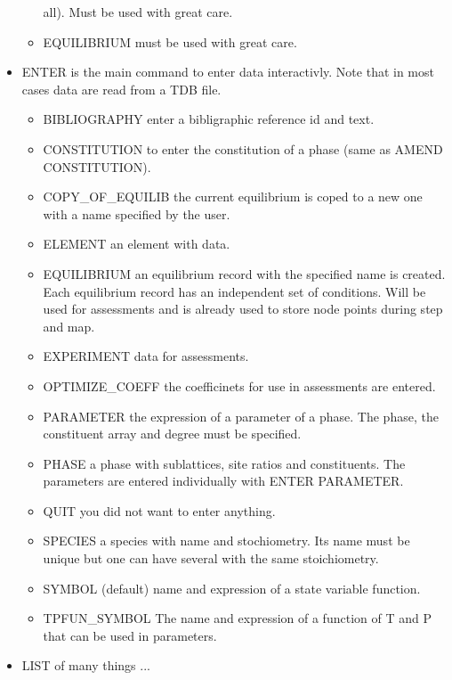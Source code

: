 \documentclass[12pt]{article}
\begin{document}
\begin{itemize}
\begin{itemize}
    all).  Must be used with great care.
  \item EQUILIBRIUM must be used with great care.
  \end{itemize}
\item ENTER is the main command to enter data interactivly.  Note that
  in most cases data are read from a TDB file.
  \begin{itemize}
  \item BIBLIOGRAPHY enter a bibligraphic reference id and text.
  \item CONSTITUTION to enter the constitution of a phase (same as AMEND
    CONSTITUTION).
  \item COPY\_OF\_EQUILIB the current equilibrium is coped to a new one
    with a name specified by the user.
  \item ELEMENT an element with data.
  \item EQUILIBRIUM an equilibrium record with the specified name is
    created.  Each equilibrium record has an independent set of
    conditions.  Will be used for assessments and is already used to
    store node points during step and map.
  \item EXPERIMENT data for assessments.
  \item OPTIMIZE\_COEFF the coefficinets for use in assessments are
    entered.
  \item PARAMETER the expression of a parameter of a phase.  The phase,
    the constituent array and degree must be specified.
  \item PHASE a phase with sublattices, site ratios and constituents.
    The parameters are entered individually with ENTER PARAMETER.
  \item QUIT you did not want to enter anything.
  \item SPECIES a species with name and stochiometry.  Its name must be
    unique but one can have several with the same stoichiometry.
  \item SYMBOL (default) name and expression of a state variable
    function.
  \item TPFUN\_SYMBOL The name and expression of a function of T and P
    that can be used in parameters.
  \end{itemize}
\item LIST of many things ...  


\end{itemize}
\end{document}
